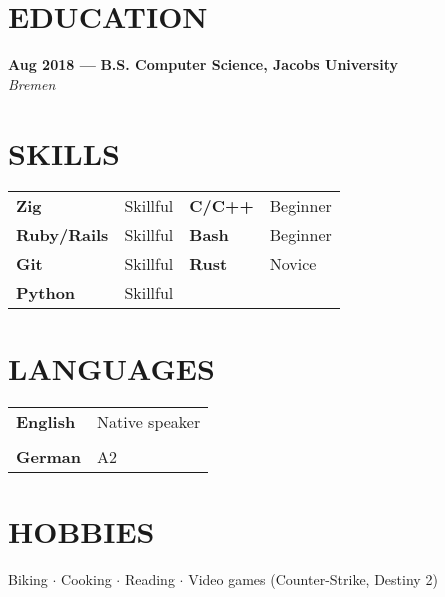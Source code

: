 \documentclass[11pt,a4paper]{article}
\newcommand{\resumesection}[1]{
  \section*{\textcolor{sectioncolor}{\MakeUppercase{#1}}}
}
\newcommand{\skill}[2]{
  \textbf{#1} & #2 \\
}
\newcommand{\job}[4]{
  \textbf{#1 — #2} \hfill \textbf{#3} \\
  \textit{#4}
}
\begin{document}
\resumesection{Education}
\job{Aug 2018} {} {B.S. Computer Science, Jacobs University} {Bremen}

\resumesection{Skills}
\begin{tabular}{p{}p{}p{}p{}}
  \textbf{Zig} & Skillful & \textbf{C/C++} & Beginner \\
  \textbf{Ruby/Rails} & Skillful &   \textbf{Bash} & Beginner \\
  \textbf{Git} & Skillful & \textbf{Rust} & Novice \\
  \textbf{Python} & Skillful & \\
\end{tabular}

\resumesection{Languages}
\begin{tabular}{ll}
  \skill{English} {Native speaker} \\
  \skill{German} {A2}
\end{tabular}

\resumesection{Hobbies}
Biking $\cdot$
Cooking $\cdot$
Reading $\cdot$
Video games (Counter-Strike, Destiny 2)
\end{document}
